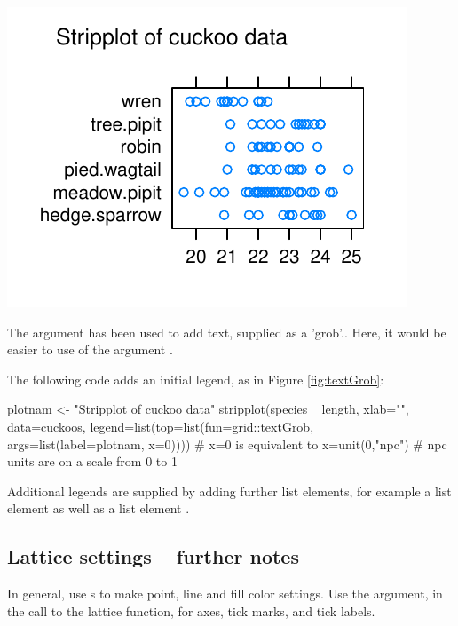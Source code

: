 \begin{marginfigure}[-36pt]
\begin{Schunk}


\centerline{\includegraphics[width=\textwidth]{figs/09-strip-grob-1} }

\end{Schunk}
\caption{The argument  has been used to add text,
  supplied as a 'grob'.\label{fig:textGrob}. Here, it would be
  easier to use of the argument .}
\end{marginfigure}

The following code adds an initial legend, as in Figure \ref{fig:textGrob}:
\begin{Schunk}
\begin{Sinput}
plotnam <- "Stripplot of cuckoo data"
stripplot(species ~ length, xlab="", data=cuckoos,
  legend=list(top=list(fun=grid::textGrob,
                       args=list(label=plotnam,
                                 x=0))))
# x=0 is equivalent to x=unit(0,"npc")
# npc units are on a scale from 0 to 1
\end{Sinput}
\end{Schunk}
Additional legends are supplied by adding further
  list elements, for example a list element  as well as a
  list element .

\subsection{Lattice settings -- further notes}\label{ss:latticeParam}

In general, use s to make point, line and fill color settings.
Use the  argument, in the call to the lattice function,
for axes, tick marks, and tick labels.

